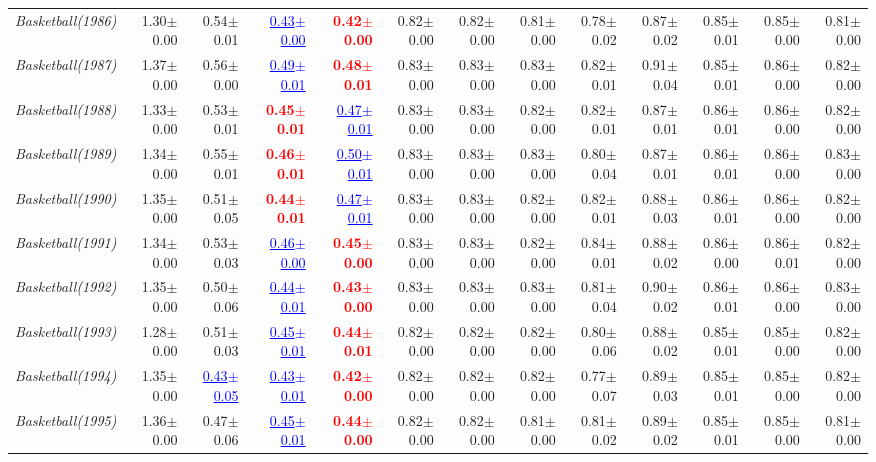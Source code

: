 \documentclass[nohyperref]{article}
\theoremstyle{plain}
\theoremstyle{definition}
\theoremstyle{remark}
\newcommand{\red}[1]{\textcolor{red}{\textbf{#1}}}
\newcommand{\blue}[1]{\textcolor{blue}{\underline{#1}}}
\begin{document}
\begin{table*}[!ht]
{\begin{tabular}{lrr|rrrrr|rrrrr}
			{\it Basketball(1986)} & 1.30$\pm$0.00 & 0.54$\pm$0.01 & \blue{0.43$\pm$0.00} & \red{0.42$\pm$0.00} & 0.82$\pm$0.00 & 0.82$\pm$0.00 & 0.81$\pm$0.00 & 0.78$\pm$0.02 & 0.87$\pm$0.02 & 0.85$\pm$0.01 & 0.85$\pm$0.00 & 0.81$\pm$0.00 \\
			{\it Basketball(1987)} & 1.37$\pm$0.00 & 0.56$\pm$0.00 & \blue{0.49$\pm$0.01} & \red{0.48$\pm$0.01} & 0.83$\pm$0.00 & 0.83$\pm$0.00 & 0.83$\pm$0.00 & 0.82$\pm$0.01 & 0.91$\pm$0.04 & 0.85$\pm$0.01 & 0.86$\pm$0.00 & 0.82$\pm$0.00 \\
			{\it Basketball(1988)} & 1.33$\pm$0.00 & 0.53$\pm$0.01 & \red{0.45$\pm$0.01} & \blue{0.47$\pm$0.01} & 0.83$\pm$0.00 & 0.83$\pm$0.00 & 0.82$\pm$0.00 & 0.82$\pm$0.01 & 0.87$\pm$0.01 & 0.86$\pm$0.01 & 0.86$\pm$0.00 & 0.82$\pm$0.00 \\
			{\it Basketball(1989)} & 1.34$\pm$0.00 & 0.55$\pm$0.01 & \red{0.46$\pm$0.01} & \blue{0.50$\pm$0.01} & 0.83$\pm$0.00 & 0.83$\pm$0.00 & 0.83$\pm$0.00 & 0.80$\pm$0.04 & 0.87$\pm$0.01 & 0.86$\pm$0.01 & 0.86$\pm$0.00 & 0.83$\pm$0.00 \\
			{\it Basketball(1990)} & 1.35$\pm$0.00 & 0.51$\pm$0.05 & \red{0.44$\pm$0.01} & \blue{0.47$\pm$0.01} & 0.83$\pm$0.00 & 0.83$\pm$0.00 & 0.82$\pm$0.00 & 0.82$\pm$0.01 & 0.88$\pm$0.03 & 0.86$\pm$0.01 & 0.86$\pm$0.00 & 0.82$\pm$0.00 \\
			{\it Basketball(1991)} & 1.34$\pm$0.00 & 0.53$\pm$0.03 & \blue{0.46$\pm$0.00} & \red{0.45$\pm$0.00} & 0.83$\pm$0.00 & 0.83$\pm$0.00 & 0.82$\pm$0.00 & 0.84$\pm$0.01 & 0.88$\pm$0.02 & 0.86$\pm$0.00 & 0.86$\pm$0.01 & 0.82$\pm$0.00 \\
			{\it Basketball(1992)} & 1.35$\pm$0.00 & 0.50$\pm$0.06 & \blue{0.44$\pm$0.01} & \red{0.43$\pm$0.00} & 0.83$\pm$0.00 & 0.83$\pm$0.00 & 0.83$\pm$0.00 & 0.81$\pm$0.04 & 0.90$\pm$0.02 & 0.86$\pm$0.01 & 0.86$\pm$0.00 & 0.83$\pm$0.00 \\
			{\it Basketball(1993)} & 1.28$\pm$0.00 & 0.51$\pm$0.03 & \blue{0.45$\pm$0.01} & \red{0.44$\pm$0.01} & 0.82$\pm$0.00 & 0.82$\pm$0.00 & 0.82$\pm$0.00 & 0.80$\pm$0.06 & 0.88$\pm$0.02 & 0.85$\pm$0.01 & 0.85$\pm$0.00 & 0.82$\pm$0.00 \\
			{\it Basketball(1994)} & 1.35$\pm$0.00 & \blue{0.43$\pm$0.05} & \blue{0.43$\pm$0.01} & \red{0.42$\pm$0.00} & 0.82$\pm$0.00 & 0.82$\pm$0.00 & 0.82$\pm$0.00 & 0.77$\pm$0.07 & 0.89$\pm$0.03 & 0.85$\pm$0.01 & 0.85$\pm$0.00 & 0.82$\pm$0.00 \\
			{\it Basketball(1995)} & 1.36$\pm$0.00 & 0.47$\pm$0.06 & \blue{0.45$\pm$0.01} & \red{0.44$\pm$0.00} & 0.82$\pm$0.00 & 0.82$\pm$0.00 & 0.81$\pm$0.00 & 0.81$\pm$0.02 & 0.89$\pm$0.02 & 0.85$\pm$0.01 & 0.85$\pm$0.00 & 0.81$\pm$0.00 \\

\end{tabular}}
\end{table*}
\end{document}
